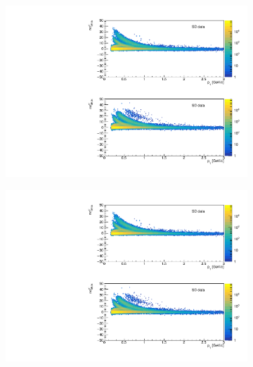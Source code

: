\begin{figure}[H]
	\centering
	\parbox{0.3\textwidth}{
		\centering
		\begin{subfigure}[b]{\linewidth}{
				{\includegraphics[width=\linewidth, page=22]{graphics/pid/spectraFit_SDT.pdf}}}
		\end{subfigure}
	}
	\quad
	\parbox{0.3\textwidth}{
		\centering
		\begin{subfigure}[b]{\linewidth}{
				{\includegraphics[width=\linewidth, page=23]{graphics/pid/spectraFit_SDT.pdf}}}
		\end{subfigure}
	}
	\parbox{0.3\textwidth}{
			\centering
}
\end{figure}
